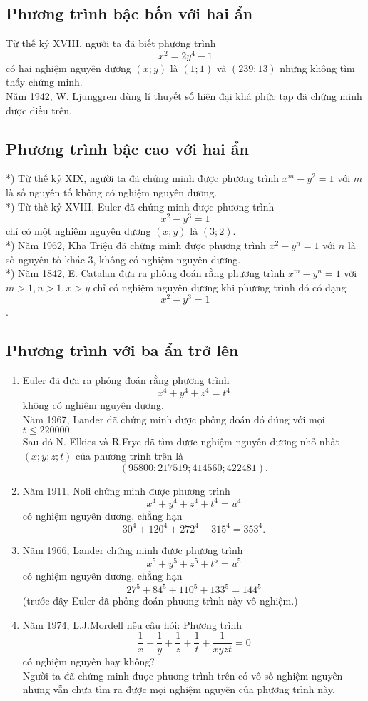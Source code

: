 \subsection{Phương trình bậc bốn với hai ẩn}
   Từ thế kỷ XVIII, người ta đã biết phương trình $$x^2=2y^4-1$$ có hai nghiệm nguyên dương $(x;y)$ là $(1;1)$ và $(239;13)$ nhưng không tìm thấy chứng minh.\\
   Năm 1942, W. Ljunggren dùng lí thuyết số hiện đại khá phức tạp đã chứng minh được điều trên.
\subsection{Phương trình bậc cao với hai ẩn}
   *) Từ thế kỷ XIX, người ta đã chứng minh được phương trình $x^m-y^2=1$ với $m$ là số nguyên tố không có nghiệm nguyên dương.\\
   *) Từ thế kỷ XVIII, Euler đã chứng minh được phương trình $$x^2-y^3=1$$ chỉ có một nghiệm nguyên dương $(x;y)$ là $(3;2).$\\
   *) Năm 1962, Kha Triệu đã chứng minh được phương trình $x^2-y^n=1$ với $n$ là số nguyên tố khác 3, không có nghiệm nguyên dương.\\
   *) Năm 1842, E. Catalan đưa ra phỏng đoán rằng phương trình $ x^m-y^n =1$ với $ m>1, n>1, x>y$ chỉ có nghiệm nguyên dương khi phương trình đó có dạng $$x^2-y^3=1$$.
\subsection{Phương trình với ba ẩn trở lên}
\begin{enumerate}
	\item  Euler đã đưa ra phỏng đoán rằng phương trình $$x^4+y^4+z^4=t^4$$
	không có nghiệm nguyên dương.\\
	Năm 1967, Lander đã chứng minh được phỏng đoán đó đúng với mọi $t \leq 220000.$\\
	Sau đó N. Elkies và R.Frye đã tìm được nghiệm nguyên dương nhỏ nhất $(x;y;z;t)$ của phương trình trên là $$(95800; 217519; 414560; 422481).$$
	\item  Năm 1911, Noli chứng minh được phương trình $$x^4+y^4+z^4+t^4=u^4$$ có nghiệm nguyên dương, chẳng hạn $$30^4+120^4+272^4+315^4=353^4.$$
	\item  Năm 1966, Lander chứng minh được phương trình $$x^5+y^5+z^5+t^5=u^5$$ có nghiệm nguyên dương, chẳng hạn $$27^5+84^5+110^5+133^5=144^5$$ (trước đây Euler đã phỏng đoán phương trình này vô nghiệm.)
	\item  Năm 1974, L.J.Mordell nêu câu hỏi: Phương trình $$\dfrac{1}{x}+\dfrac{1}{y}+\dfrac{1}{z}+\dfrac{1}{t}+\dfrac{1}{xyzt}=0$$
	có nghiệm nguyên hay không?\\
	Người ta đã chứng minh được phương trình trên có vô số nghiệm nguyên nhưng vẫn chưa tìm ra được mọi nghiệm nguyên của phương trình này.		
\end{enumerate}